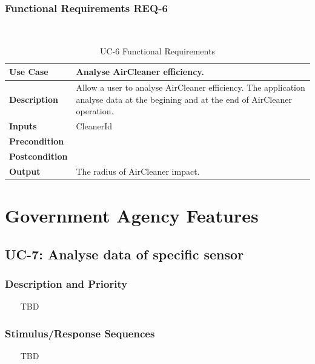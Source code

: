 \documentclass{report}
\begin{document}
\subsubsection*{Functional Requirements REQ-6} ~~~
\begin{table}[H]
	\begin{center}
		\begin{tabular}{|m{4cm}|m{10cm}|}
		\hline
		\textbf{Use Case} & Analyse AirCleaner efficiency. \\
		\hline
		\textbf{Description} & Allow a user to analyse AirCleaner efficiency. The application analyse data at the begining and at the end of AirCleaner operation. \\
		\hline
		\textbf{Inputs} & CleanerId\\
		\hline
		\textbf{Precondition} & \\
		\hline
		\textbf{Postcondition} &  \\
		\hline
		\textbf{Output} & The radius of AirCleaner impact. \\
		\hline
		\end{tabular}
	\end{center}
	\caption{UC-6 Functional Requirements}
	\label{table:REQ-6}
\end{table}

\section{Government Agency Features}

\subsection{UC-7: Analyse data of specific sensor}

\subsubsection*{Description and Priority} ~~~
TBD

\subsubsection*{Stimulus/Response Sequences} ~~~
TBD
\end{document}
